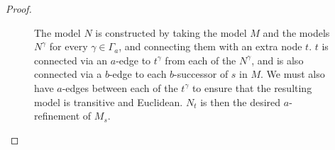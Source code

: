 \begin{proof}
\begin{figure}
\begin{center} %
\caption{\label{kd45-diagram}
The model $N$ is constructed by taking the model $M$ and the models $N^\gamma$
for every $\gamma \in \Gamma_a$, and connecting them with an extra node $t$. $t$
is connected via an $a$-edge to $t^\gamma$ from each of the $N^\gamma$, and is
also connected via a $b$-edge to each $b$-successor of $s$ in $M$. We must also
have $a$-edges between each of the $t^\gamma$ to ensure that the resulting model
is transitive and Euclidean. $N_t$ is then the desired $a$-refinement of $M_s$.
}
\end{center}
\end{figure}


\end{proof}
